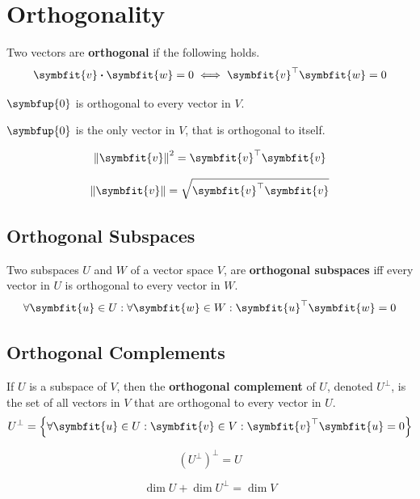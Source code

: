 \documentclass{article}
\begin{document}
\section{Orthogonality}
	\begin{definition}
		Two vectors are \textbf{orthogonal} if the following holds.
		\begin{equation*}
			\symbfit{v}\vdot \symbfit{w}=0 \iff \symbfit{v}^{\top}\symbfit{w}=0
		\end{equation*}
	\end{definition}
	\begin{theorem}
		$\symbfup{0}$ is orthogonal to every vector in $V$.
	\end{theorem}
	\begin{theorem}
		$\symbfup{0}$ is the only vector in $V$, that is orthogonal to itself.
	\end{theorem}
	\begin{theorem}
		\begin{equation*}
			\norm{\symbfit{v}}^2=\symbfit{v}^{\top}\symbfit{v}
		\end{equation*}
	\end{theorem}
	\begin{theorem}
		\begin{equation*}
			\norm{\symbfit{v}}=\sqrt{\symbfit{v}^{\top}\symbfit{v}}
		\end{equation*}
	\end{theorem}
	\subsection{Orthogonal Subspaces}
	\begin{definition}
		Two subspaces $U$ and $W$ of a vector space $V$, are \textbf{orthogonal subspaces} iff every vector in $U$ is orthogonal to every vector in $W$.
		\begin{equation*}
			\forall \symbfit{u}\in U:\forall \symbfit{w}\in W:\symbfit{u}^{\top}\symbfit{w}=0
		\end{equation*}
	\end{definition}
	\subsection{Orthogonal Complements}
	\begin{definition}
		If $U$ is a subspace of $V$, then the \textbf{orthogonal complement} of $U$, denoted $U^{\perp}$, is the set of all vectors in $V$ that are orthogonal to every vector in $U$.
		\begin{equation*}
			U^{\perp} = \left\{ \forall \symbfit{u}\in U:\symbfit{v}\in V: \symbfit{v}^{\top}\symbfit{u}=0 \right\}
		\end{equation*}
	\end{definition}
	\begin{theorem}
		\begin{equation*}
			\left( U^{\perp} \right)^{\perp}=U
		\end{equation*}
	\end{theorem}
	\begin{theorem}
		\begin{equation*}
			\dim{U} + \dim{U^{\perp}} = \dim{V}
		\end{equation*}
	\end{theorem}
\end{document}

